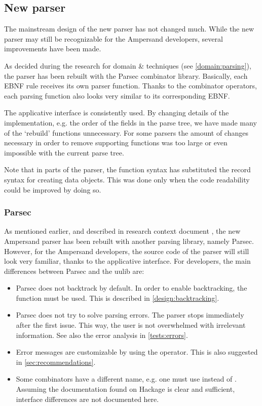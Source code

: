 
\subsection{New parser}
\label{design:new-parser}
The mainstream design of the new parser has not changed much.
While the new parser may still be recognizable for the Ampersand developers, several improvements have been made.

As decided during the research for domain \& techniques (see \autoref{domain:parsing}), the parser has been rebuilt with the Parsec combinator library.
Basically, each EBNF rule receives its own parser function.
Thanks to the combinator operators, each parsing function also looks very similar to its corresponding EBNF.

The applicative interface is consistently used.
By changing details of the implementation, e.g. the order of the fields in the parse tree, we have made many of the `rebuild' functions unnecessary.
For some parsers the amount of changes necessary in order to remove supporting functions was too large or even impossible with the current parse tree.

Note that in parts of the parser, the function syntax has substituted the record syntax for creating data objects.
This was done only when the code readability could be improved by doing so.

\subsubsection{Parsec}
\label{design:parsing-lib}
As mentioned earlier, and described in research context document , the new Ampersand parser has been rebuilt with another parsing library, namely Parsec.
However, for the Ampersand developers, the source code of the parser will still look very familiar, thanks to the applicative interface.
For developers, the main differences between Parsec and the uulib are:
\begin{itemize}
  \item Parsec does not backtrack by default.
    In order to enable backtracking, the  function must be used.
    This is described in \autoref{design:backtracking}.
  \item Parsec does not try to solve parsing errors.
    The parser stops immediately after the first issue.
   This way, the user is not overwhelmed with irrelevant information.
    See also the error analysis in \autoref{tests:errors}.
  \item Error messages are customizable by using the  operator.
    This is also suggested in \autoref{sec:recommendations}.
  \item Some combinators have a different name, e.g. one must use  instead of .
    Assuming the documentation found on Hackage is clear and sufficient, interface differences are not documented here.
\end{itemize}

